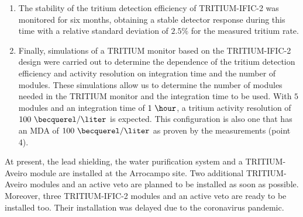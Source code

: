 \begin{enumerate}
\item{} The stability of the tritium detection efficiency of TRITIUM-IFIC-2 was monitored for six months, obtaining a stable detector response during this time with a relative standard deviation of $2.5\%$ for the measured tritium rate. 

\item{} Finally, simulations of a TRITIUM monitor based on the TRITIUM-IFIC-2 design were carried out to determine the dependence of the tritium detection efficiency and activity resolution on integration time and the number of modules. These simulations allow us to determine the number of modules needed in the TRITIUM monitor and the integration time to be used. With $5$ modules and an integration time of $1~\hour$, a tritium activity resolution of $100~\becquerel/\liter$ is expected. This configuration is also one that has an MDA of $100~\becquerel/\liter$ as proven by the measurements (point 4).

\end{enumerate}

At present, the lead shielding, the water purification system and a TRITIUM-Aveiro module are installed at the Arrocampo site. Two additional TRITIUM-Aveiro modules and an active veto are planned to be installed as soon as possible. Moreover, three TRITIUM-IFIC-2 modules and an active veto are ready to be installed too. Their installation was delayed due to the coronavirus pandemic.